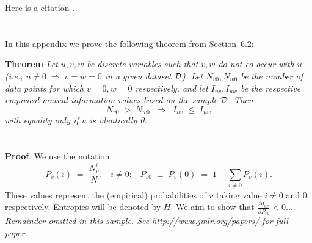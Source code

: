 \documentclass[twoside,11pt]{article}
\newcommand{\dataset}{{\cal D}}
\newcommand{\fracpartial}[2]{\frac{\partial #1}{\partial  #2}}
\begin{document}
Here is a citation \cite{chow:68}.




\newpage

\appendix
\section{}
\label{app:theorem}



In this appendix we prove the following theorem from
Section~6.2:

\noindent
{\bf Theorem} {\it Let $u,v,w$ be discrete variables such that $v, w$ do
not co-occur with $u$ (i.e., $u\neq0\;\Rightarrow \;v=w=0$ in a given
dataset $\dataset$). Let $N_{v0},N_{w0}$ be the number of data points for
which $v=0, w=0$ respectively, and let $I_{uv},I_{uw}$ be the
respective empirical mutual information values based on the sample
$\dataset$. Then
\[
	N_{v0} \;>\; N_{w0}\;\;\Rightarrow\;\;I_{uv} \;\leq\;I_{uw}
\]
with equality only if $u$ is identically 0.} \hfill\BlackBox

\section{}

\noindent
{\bf Proof}. We use the notation:
\[
P_v(i) \;=\;\frac{N_v^i}{N},\;\;\;i \neq 0;\;\;\;
P_{v0}\;\equiv\;P_v(0)\; = \;1 - \sum_{i\neq 0}P_v(i).
\]
These values represent the (empirical) probabilities of $v$
taking value $i\neq 0$ and 0 respectively.  Entropies will be denoted
by $H$. We aim to show that $\fracpartial{I_{uv}}{P_{v0}} < 0$....\\

{\noindent \em Remainder omitted in this sample. See http://www.jmlr.org/papers/ for full paper.}


\vskip 0.2in

\end{document}
